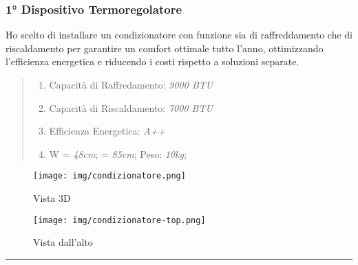 \documentclass[italian, 12pt, a4paper]{article}
\begin{document}
\subsubsection{1° Dispositivo Termoregolatore}
Ho scelto di installare un condizionatore con funzione sia di raffreddamento che di riscaldamento per garantire un comfort ottimale tutto l'anno, ottimizzando l'efficienza energetica e riducendo i costi rispetto a soluzioni separate.
\begin{quote}
    \begin{enumerate}
        \item Capacità di Raffredamento: \emph{9000 BTU}
        \item Capacità di Riscaldamento: \emph{7000 BTU}
        \item Efficienza Energetica: \emph{A++}
        \item W = \emph{48cm};  = \emph{85cm}; Peso: \emph{10kg}; 
    \end{enumerate}
\end{quote}
\begin{figure}[h!]
    \centering
    \begin{minipage}{0.45\textwidth}
        \centering
        \texttt{[image: img/condizionatore.png]}
        \caption{Vista 3D}
    \end{minipage} \hfill
    \begin{minipage}{0.45\textwidth}
        \centering
        \texttt{[image: img/condizionatore-top.png]}
        \caption{Vista dall'alto}
    \end{minipage}
\end{figure}
\hrule
\end{document}

